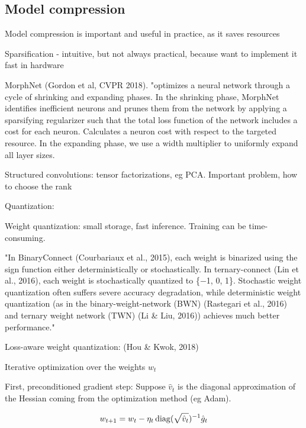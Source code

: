 \documentclass[english]{article}
\begin{document}
\eenum 



\subsection{Model compression}


\benum 
\item Model compression is important and useful in practice, as it saves resources

\item Sparsification - intuitive, but not always practical, because want to implement it fast in hardware 

MorphNet (Gordon et al, CVPR 2018). "optimizes a neural network through a cycle of shrinking and expanding phases. In the shrinking phase, MorphNet identifies inefficient neurons and prunes them from the network by applying a sparsifying regularizer such that the total loss function of the network includes a cost for each neuron. Calculates a neuron cost with respect to the targeted resource. In the expanding phase, we use a width multiplier to uniformly expand all layer sizes. 

\item Structured convolutions: tensor factorizations, eg PCA. Important problem, how to choose the rank

\item Quantization:

Weight quantization: small storage, fast inference. Training can be time-consuming. 

"In BinaryConnect (Courbariaux et al., 2015), each weight is binarized using the sign function either
deterministically or stochastically. In ternary-connect (Lin et al., 2016), each weight is stochastically
quantized to \{−1, 0, 1\}. Stochastic weight quantization often suffers severe accuracy degradation,
while deterministic weight quantization (as in the binary-weight-network (BWN) (Rastegari et al.,
2016) and ternary weight network (TWN) (Li \& Liu, 2016)) achieves much better performance."


Loss-aware weight quantization: (Hou \& Kwok, 2018)

Iterative optimization over the weights $w_t$

First, preconditioned gradient step: Suppose $\hat v_t$ is the diagonal approximation of the Hessian coming from the optimization method (eg Adam).

$$w_{t+1} = w_t - \eta_t \operatorname{diag}(\sqrt{\hat v_t})^{-1}\hat g_t$$
\end{document}
